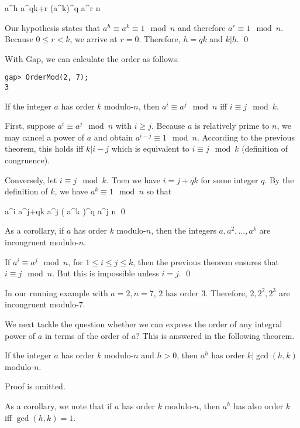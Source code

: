 \bee
a^h \equiv a^{qk+r} \equiv \left(a^k\right)^q a^r \mod n
\eee

Our hypothesis states that $a^h \equiv a^k \equiv 1 \mod n$ and therefore $a^r \equiv 1 \mod n$. Because $0 \leq r < k$, we arrive at $r=0$. Therefore, $h = qk$ and $k | h$. \qed

With Gap, we can calculate the order as follows.

\begin{verbatim}
gap> OrderMod(2, 7);
3
\end{verbatim}


\begin{theorem}
  \label{2021-03-02:th1}
  If the integer $a$ has order $k$ modulo-$n$, then $a^i \equiv a^j \mod n$ iff $i \equiv j \mod k$.
\end{theorem}

First, suppose $a^i \equiv a^j \mod n$ with $i \geq j$. Because $a$ is relatively prime to $n$, we may cancel a power of $a$ and obtain $a^{i-j} \equiv 1 \mod n$. According to the previous theorem, this holds iff $k | i-j$ which is equivalent to $i \equiv j \mod k$ (definition of congruence). 

Conversely, let $i \equiv j \mod k$. Tnen we have $i = j+  qk$ for some integer $q$. By the definition of $k$, we have $a^k \equiv 1 \mod n$ so that

\bee
a^i \equiv a^{j+qk} \equiv a^j \left( a^k \right)^q \equiv a^j \mod n \qed
\eee

As a corollary, if $a$ has order $k$ modulo-$n$, then the integers $a, a^2, \ldots, a^k$ are incongruent modulo-$n$.

If $a^i \equiv a^j \mod n$, for $1 \leq i \leq j \leq k$, then the previous theorem ensures that $i \equiv j \mod n$. But this is impossible unless $i=j$. \qed

In our running example with $a=2, n=7$, $2$ has order $3$. Therefore, $2, 2^2, 2^3$ are incongruent modulo-$7$.

We next tackle the question whether we can express the order of any integral power of $a$ in terms of the order of $a$? This is answered in the following theorem.

\begin{theorem}
  If the integer $a$ has order $k$ modulo-$n$ and $h > 0$, then $a^h$ has order $k | \gcd(h,k)$ modulo-$n$.
\end{theorem}

Proof is omitted.

As a corollary, we note that if $a$ has order $k$ modulo-$n$, then $a^h$ has also order $k$ iff $\gcd(h,k)=1$.

